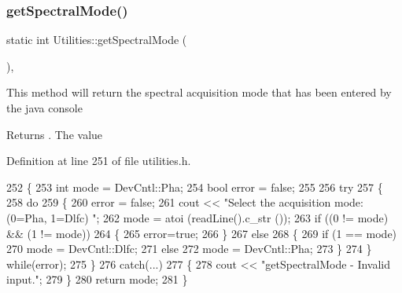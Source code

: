 \subsubsection{\texorpdfstring{get\+Spectral\+Mode()}{getSpectralMode()}}
{\footnotesize\ttfamily static int Utilities\+::get\+Spectral\+Mode (\begin{DoxyParamCaption}{ }\end{DoxyParamCaption})\hspace{0.3cm}{\ttfamily [inline]}, {\ttfamily [static]}}

This method will return the spectral acquisition mode that has been entered by the java console \begin{DoxyReturn}{Returns}
. The value 
\end{DoxyReturn}


Definition at line 251 of file utilities.\+h.


\begin{DoxyCode}
252     \{
253         \textcolor{keywordtype}{int} mode = DevCntl::Pha;
254         \textcolor{keywordtype}{bool} error = \textcolor{keyword}{false};
255 
256         \textcolor{keywordflow}{try} 
257         \{
258             \textcolor{keywordflow}{do} 
259             \{
260                 error = \textcolor{keyword}{false};
261                 cout << \textcolor{stringliteral}{"Select the acquisition mode: (0=Pha, 1=Dlfc) "};
262                 mode = atoi (readLine().c\_str ());
263                 \textcolor{keywordflow}{if} ((0 != mode) && (1 != mode))
264                 \{
265                     error=\textcolor{keyword}{true};
266                 \}
267                 \textcolor{keywordflow}{else} 
268                 \{
269                     \textcolor{keywordflow}{if} (1 == mode) 
270                         mode = DevCntl::Dlfc;
271                     \textcolor{keywordflow}{else} 
272                         mode = DevCntl::Pha;
273                 \}
274             \} \textcolor{keywordflow}{while}(error);
275         \}
276         \textcolor{keywordflow}{catch}(...) 
277         \{
278             cout << \textcolor{stringliteral}{"getSpectralMode - Invalid input."};
279         \}
280         \textcolor{keywordflow}{return} mode;
281     \}
\end{DoxyCode}
\mbox{\label{class_utilities_a513806325f04d3f14657656d391fd581_a513806325f04d3f14657656d391fd581}} 
